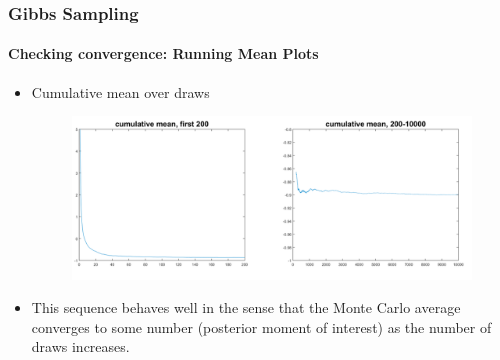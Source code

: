 \documentclass[
  shownotes,
  xcolor={svgnames},
  hyperref={colorlinks,citecolor=DarkBlue,linkcolor=DarkRed,urlcolor=DarkBlue}
  , aspectratio=169]{beamer}
\begin{document}
\begin{frame}[fragile]
\frametitle{Gibbs Sampling} 
\framesubtitle{Checking convergence: Running Mean Plots}
 
\begin{itemize}
\item Cumulative mean over draws

  \begin{figure}[H] \centering
  \centering
  \includegraphics[scale=0.45]{figures/fig4_gibbs}
  \\
  \tiny 
\end{figure}

\item This sequence behaves well in the sense that the Monte Carlo average converges to some number (posterior moment of interest) as the number of
draws increases.
\end{itemize}
 




 \end{frame}
\end{document}
